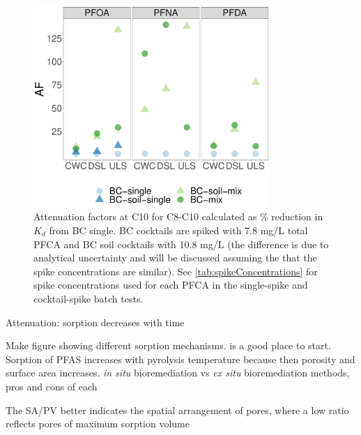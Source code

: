 \begin{figure}[htb]
    \centering
    \includegraphics[width=0.8\textwidth]{R/figs/Attenuation_factors_C10_OND.pdf}
    \caption{Attenuation factors at C10 for C8-C10 calculated as \% reduction in $K_d$ from BC single. BC cocktails are spiked with 7.8 mg/L total PFCA and BC soil cocktails with 10.8 mg/L (the difference is due to analytical uncertainty and will be discussed assuming the that the spike concentrations are similar). See \cref{tab:spikeConcentrations} for spike concentrations used for each PFCA in the single-spike and cocktail-spike batch tests.}
    \label{fig:attenuation_factors}
\end{figure}

Attenuation: sorption decreases with time

Make figure showing different sorption mechanisms.\citep{Li2019} is a good place to start. Sorption of PFAS increases with pyrolysis temperature because then porosity and surface area increases.  \textit{in situ} bioremediation vs \textit{ex situ} bioremediation methods, pros and cons of each

The SA/PV better indicates the spatial arrangement of pores, where a low ratio reflects pores of maximum sorption volume

